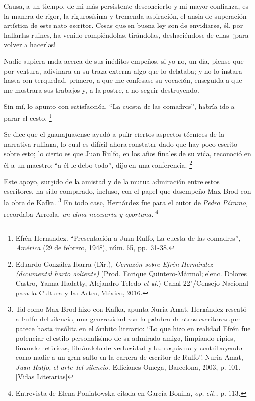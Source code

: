\documentclass[14pt,twoside,final]{extbook} %
\let\oldfootnote\footnote
\renewcommand\footnote[1]{%
\oldfootnote{\hspace{1mm}#1}}
\begin{document}
\begin{quoting}
Causa, a un tiempo, de mi más persistente desconcierto y mi mayor confianza, es la manera de rigor, la rigurosísima y tremenda aspiración, el ansia de superación artística de este nato escritor. Cosas que en buena ley son de envidiarse, él, por hallarlas ruines, ha venido rompiéndolas, tirándolas, deshaciéndose de ellas, ¡para volver a hacerlas!

Nadie supiera nada acerca de sus inéditos empeños, si yo no, un día, pienso que por ventura, adivinara en su traza externa algo que lo delataba; y no lo instara hasta con terquedad, primero, a que me confesase su vocación, enseguida a que me mostrara sus trabajos y, a la postre, a no seguir destruyendo.

Sin mí, lo apunto con satisfacción, ``La cuesta de las comadres'', habría ido a parar al cesto.\footnote{Efrén Hernández, ``Presentación a Juan Rulfo, \textquotesingle\textquotesingle{}La cuesta de las comadres\textquotesingle\textquotesingle{}'', \emph{América} (29 de febrero, 1948), núm. 55, \mbox{pp. 31-38.}}
\end{quoting}
Se dice que el guanajuatense ayudó a pulir ciertos aspectos técnicos de la narrativa rulfiana, lo cual es difícil ahora constatar dado que hay poco escrito sobre esto; lo cierto es que Juan Rulfo, en los años finales de su vida, reconoció en él a un maestro: ``a él le debo todo'', dijo en una conferencia.\footnote{Eduardo González Ibarra (Dir.), \emph{Cerrazón sobre Efrén Hernández (documental harto doliente)} (Prod. Enrique Quintero-Mármol; elenc. Dolores Castro, Yanna Hadatty, Alejandro Toledo \emph{et al.}) Canal 22"/Consejo Nacional para la Cultura y las Artes, México, 2016.}

Este apoyo, surgido de la amistad y de la mutua admiración entre estos escritores, ha sido comparado, incluso, con el papel que desempeñó Max Brod con la obra de Kafka.\footnote{Tal como Max Brod hizo con Kafka, apunta Nuria Amat, Hernández rescató a Rulfo del silencio, una generosidad con la palabra de otros escritores que parece hasta insólita en el ámbito literario: ``Lo que hizo en realidad Efrén fue potenciar el estilo personalísimo de su admirado amigo, limpiando ripios, limando retóricas, librándolo de verbosidad y barroquismo y contribuyendo como nadie a un gran salto en la carrera de escritor de Rulfo''. Nuria Amat, \emph{Juan Rulfo, el arte del silencio.} Ediciones Omega, Barcelona, 2003, p. 101. [Vidas Literarias]} En todo caso, Hernández fue para el autor de \emph{Pedro Páramo,} recordaba Arreola, \emph{un alma necesaria y oportuna.}\footnote{Entrevista de Elena Poniatowska citada en García Bonilla, \emph{op. cit.,} p. 113.}
\end{document}
